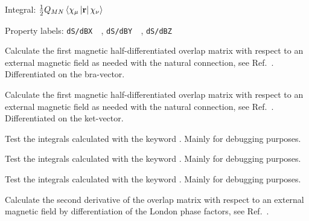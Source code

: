 \begin{description}
\begin{list}{}{}
\item Integral: $\frac{1}{2}Q_{MN}\left<\chi_{\mu}\left|{\bf
r}\right|\chi_{\nu}\right>$
\item Property labels: \verb|dS/dBX  |, \verb|dS/dBY  |,
\verb|dS/dBZ  |
\end{list}

\item[\Key{S1MAGL}] Calculate the first magnetic half-differentiated overlap
matrix with respect to an
external magnetic field as needed with the
natural connection, see
Ref.~\cite{krthklbpjjocp195}. Differentiated
on the bra-vector.


\item[\Key{S1MAGR}] Calculate the first magnetic half-differentiated overlap
matrix with respect to an external magnetic field as needed with the
natural connection, see Ref.~\cite{krthklbpjjocp195}. Differentiated on
the ket-vector.


\item[\Key{S1MAGT}] Test the integrals calculated with the keyword
. Mainly for debugging purposes.

\item[\Key{S1MLT}] Test the integrals calculated with the keyword
. Mainly for debugging purposes.

\item[\Key{S1MRT}] Test the integrals calculated with the keyword
. Mainly for debugging purposes.

\item[\Key{S2MAG}] Calculate the second derivative of the overlap
matrix with respect to an external magnetic field by differentiation
of the London phase factors, see Ref.~\cite{thpjjcp95}.


\end{description}
